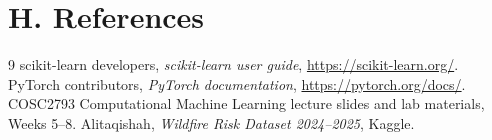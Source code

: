 \documentclass[11pt,a4paper]{article}
\begin{document}
\section{H. References}
\begin{thebibliography}{9}
 scikit-learn developers, \emph{scikit-learn user guide}, \url{https://scikit-learn.org/}.
 PyTorch contributors, \emph{PyTorch documentation}, \url{https://pytorch.org/docs/}.
 COSC2793 Computational Machine Learning lecture slides and lab materials, Weeks 5--8.
 Alitaqishah, \emph{Wildfire Risk Dataset 2024--2025}, Kaggle.
\end{thebibliography}
\end{document}
